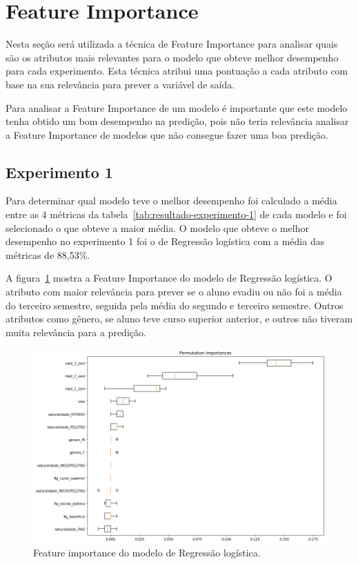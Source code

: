 \documentclass[diss,capa]{texufpel}
\begin{document}
\section{Feature Importance}

Nesta seção será utilizada a técnica de Feature Importance para analisar quais são os atributos mais relevantes para o modelo que obteve melhor desempenho para cada experimento.
Esta técnica atribui uma pontuação a cada atributo com base na sua relevância para prever a variável de saída.

Para analisar a Feature Importance de um modelo é importante que este modelo tenha obtido um bom desempenho na predição, pois não teria relevância analisar a Feature Importance de modelos que não consegue fazer uma boa predição.

\subsection{Experimento 1}

Para determinar qual modelo teve o melhor desempenho foi calculado a média entre as 4 métricas da tabela~\ref{tab:resultado-experimento-1} de cada modelo e foi selecionado o que obteve a maior média.
O modelo que obteve o melhor desempenho no experimento 1 foi o de Regressão logística com a média das métricas de 88,53\%.

A figura~\ref{fig:e1-feature-importance-rl} mostra a Feature Importance do modelo de Regressão logística.
O atributo com maior relevância para prever se o aluno evadiu ou não foi a média do terceiro semestre, seguida pela média do segundo e terceiro semestre.
Outros atributos como gênero, se aluno teve curso superior anterior, e outros não tiveram muita relevância para a predição.


\begin{figure}[htbp]
\centering
\includegraphics[scale=.53]{imagens/e1-feature-importance-rl.png}
\caption{Feature importance do modelo de Regressão logística.}
\label{fig:e1-feature-importance-rl}
\end{figure}
\end{document}
